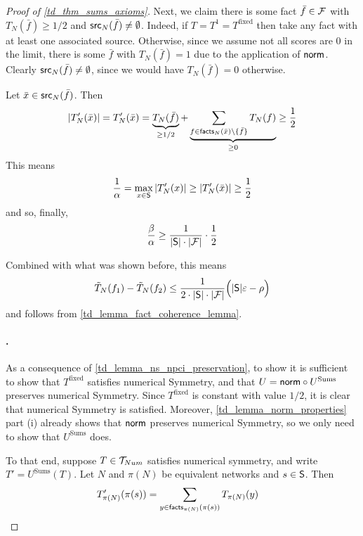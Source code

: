 \begin{proof}[Proof of \cref{td_thm_sums_axioms}]
Next, we claim there is some fact $\bar{f} \in \F$ with $T_N(\bar{f}) \ge 1 /
2$ and $\src_N(\bar{f}) \ne \emptyset$. Indeed, if $T = T^1 = T^{\text{fixed}}$
then take any fact with at least one associated source.\footnotemark{}
Otherwise, since we assume not all scores are 0 in the limit, there is some
$\bar{f}$ with $T_N(\bar{f}) = 1$ due to the application of $\norm$. Clearly
$\src_N(\bar{f}) \ne \emptyset$, since we would have $T_N(\bar{f}) = 0$
otherwise.


Let $\bar{x} \in \src_N(\bar{f})$. Then
\[
    |T'_N(\bar{x})|
    = T'_N(\bar{x})
    = \underbrace{T_N(\bar{f})}_{\ge 1 / 2}
       + \underbrace{
           \sum_{f \in \facts_N(\bar{x}) \setminus \{\bar{f}\}}{
               T_N(f)
           }
         }_{\ge 0}
    \ge \frac{1}{2}
\]
This means
\[
    \frac{1}{\alpha}
    = \max_{x \in \S}{|T'_N(x)|}
    \ge |T'_N(\bar{x})|
    \ge \frac{1}{2}
\]
and so, finally,
\[
    \frac{\beta}{\alpha}
    \ge \frac{1}{|\S| \cdot |\F|} \cdot \frac{1}{2}
\]

Combined with what was shown before, this means
\[
    \tilde{T}_N(f_1) - \tilde{T}_N(f_2)
    \le \frac{1}{2 \cdot |\S| \cdot |\F|} \Big(|\S|\epsilon - \rho\Big)
\]
and \factcoherence{} follows from \cref{td_lemma_fact_coherence_lemma}.

\paragraph{\symmetry{}.} As a consequence of \cref{td_lemma_ns_npci_preservation}, to
show \symmetry{} it is sufficient to show that $T^{\text{fixed}}$ satisfies
numerical Symmetry, and that $U = \norm \circ U^{\text{Sums}}$ preserves
numerical Symmetry. Since $T^{\text{fixed}}$ is constant with value $1/2$, it
is clear that numerical Symmetry is satisfied.  Moreover,
\cref{td_lemma_norm_properties} part (i) already shows that $\norm$ preserves
numerical Symmetry, so we only need to show that $U^{\text{Sums}}$ does.

To that end, suppose $T \in \num$ satisfies numerical symmetry, and write $T' =
U^{\text{Sums}}(T)$. Let $N$ and $\pi(N)$ be equivalent networks and $s \in
\S$. Then
\begin{align*}
    T'_{\pi(N)}(\pi(s))
    &= \sum_{y \in \facts_{\pi(N)}(\pi(s))}{T_{\pi(N)}(y)}
\end{align*}


\end{proof}
